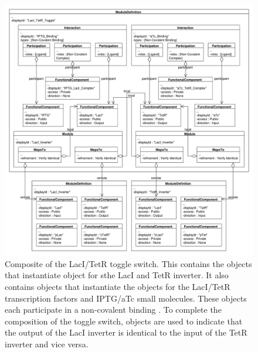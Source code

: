 \begin{figure}[ht]
\begin{center}
\includegraphics[width=\textwidth]{example_uml/toggle_4}
\caption[]{Composite  of the LacI/TetR toggle switch. This  contains the  objects that instantiate  object for sthe LacI and TetR inverter. It also contains  objects that instantiate the  objects for the LacI/TetR transcription factors and IPTG/aTc small molecules. These  objects each participate in a non-covalent binding . To complete the composition of the toggle switch,  objects are used to indicate that the output of the LacI inverter  is identical to the input of the TetR inverter  and vice versa.
}
\label{uml:ex_mod_def_compo}
\end{center}
\end{figure}


